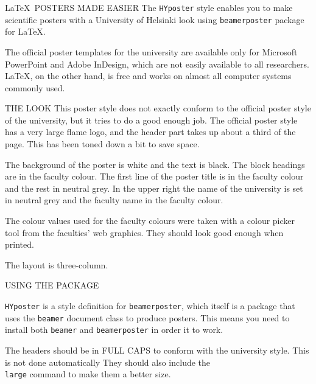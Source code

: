 \documentclass[final]{beamer}
\author[Wilkman]{Olli Wilkman}
\institute[University of Helsinki]{}
\date{\today}
\begin{document}
\begin{frame}[t, fragile]
\begin{columns}[T]
	
\begin{column}{0.32\linewidth}


\begin{block}{\LaTeX~POSTERS MADE EASIER}
The \texttt{HYposter} style enables you to make scientific posters with a University of Helsinki look using  \texttt{beamerposter} package for \LaTeX. 

The official poster templates for the university are available only for Microsoft PowerPoint and Adobe InDesign, which are not easily available to all researchers. \LaTeX, on the other hand, is free and works on almost all computer systems commonly used.

\end{block}


\begin{block}{THE LOOK}
This poster style does not exactly conform to the official poster style of the university, but it tries to do a good enough job. The official poster style has a very large flame logo, and the header part takes up about a third of the page. This has been toned down a bit to save space.

The background of the poster is white and the text is black. The block headings are in the faculty colour. The first line of the poster title is in the faculty colour and the rest in neutral grey. In the upper right the name of the university is set in neutral grey and the faculty name in the faculty colour.

The colour values used for the faculty colours were taken with a colour picker tool from the faculties' web graphics. They should look good enough when printed.

The layout is three-column.
\end{block}


\begin{block}{USING THE PACKAGE}

\texttt{HYposter} is a style definition for \texttt{beamerposter}, which itself is a package that uses the \texttt{beamer} document class to produce posters. This means you need to install both \texttt{beamer} and \texttt{beamerposter} in order it to work.

The headers should be in FULL CAPS to conform with the university style. This is not done automatically They should also include the \texttt{\\large} command to make them a better size.
\end{block}


\end{column}
\end{columns}
\end{frame}
\end{document}
